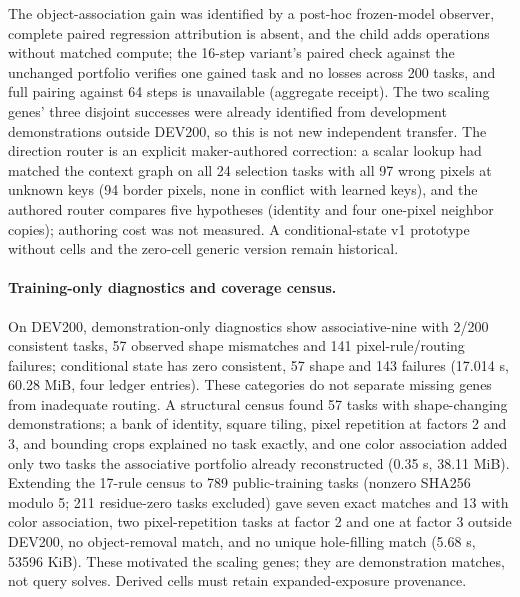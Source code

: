 \documentclass[11pt]{article}
\begin{document}
The object-association gain was identified by a post-hoc frozen-model observer, complete paired
regression attribution is absent, and the child adds operations without matched compute; the
16-step variant's paired check against the unchanged portfolio verifies one gained task and no
losses across 200 tasks, and full pairing against 64 steps is unavailable (aggregate receipt). The
two scaling genes' three disjoint successes were already identified from development demonstrations
outside DEV200, so this is not new independent transfer. The direction router is an explicit
maker-authored correction: a scalar lookup had matched the context graph on all 24 selection tasks
with all 97 wrong pixels at unknown keys (94 border pixels, none in conflict with learned keys), and
the authored router compares five hypotheses (identity and four one-pixel neighbor copies); authoring
cost was not measured. A conditional-state v1 prototype without cells and the zero-cell generic
version remain historical.

\paragraph{Training-only diagnostics and coverage census.} On DEV200, demonstration-only diagnostics
show associative-nine with 2/200 consistent tasks, 57 observed shape mismatches and 141
pixel-rule/routing failures; conditional state has zero consistent, 57 shape and 143 failures
(17.014 s, 60.28 MiB, four ledger entries). These categories do not separate missing genes from
inadequate routing. A structural census found 57 tasks with shape-changing demonstrations; a bank
of identity, square tiling, pixel repetition at factors 2 and 3, and bounding crops explained no task
exactly, and one color association added only two tasks the associative portfolio already
reconstructed (0.35 s, 38.11 MiB). Extending the 17-rule census to 789 public-training tasks
(nonzero SHA256 modulo 5; 211 residue-zero tasks excluded) gave seven exact matches and 13 with
color association, two pixel-repetition tasks at factor 2 and one at factor 3 outside DEV200, no
object-removal match, and no unique hole-filling match (5.68 s, 53596 KiB). These motivated the
scaling genes; they are demonstration matches, not query solves. Derived cells must retain
expanded-exposure provenance.
\end{document}
